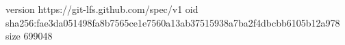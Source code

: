 version https://git-lfs.github.com/spec/v1
oid sha256:fae3da051498fa8b7565ce1e7560a13ab37515938a7ba2f4dbcbb6105b12a978
size 699048

